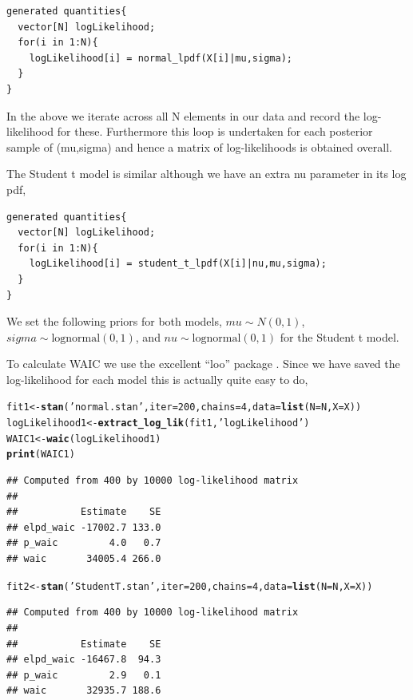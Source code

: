 \documentclass[11pt,fullpage]{book}
\makeatletter
\newenvironment{kframe}{%
	\def\at@end@of@kframe{}%
	\ifinner\ifhmode%
	\def\at@end@of@kframe{\end{minipage}}%
\begin{minipage}{\columnwidth}%
	\fi\fi%
	\def\FrameCommand##1{\hskip\@totalleftmargin \hskip-\fboxsep
		\colorbox{shadecolor}{##1}\hskip-\fboxsep
		\hskip-\linewidth \hskip-\@totalleftmargin \hskip\columnwidth}%
	\MakeFramed {\advance\hsize-\width
		\@totalleftmargin\z@ \linewidth\hsize
		\@setminipage}}%
{\par\unskip\endMakeFramed%
	\at@end@of@kframe}
\newcommand{\hlnum}[1]{\textcolor[rgb]{0.686,0.059,0.569}{#1}}%
\newcommand{\hlstr}[1]{\textcolor[rgb]{0.192,0.494,0.8}{#1}}%
\newcommand{\hlstd}[1]{\textcolor[rgb]{0.345,0.345,0.345}{#1}}%
\newcommand{\hlkwb}[1]{\textcolor[rgb]{0.69,0.353,0.396}{#1}}%
\newcommand{\hlkwc}[1]{\textcolor[rgb]{0.333,0.667,0.333}{#1}}%
\newcommand{\hlkwd}[1]{\textcolor[rgb]{0.737,0.353,0.396}{\textbf{#1}}}%
\newenvironment{knitrout}{}{} %
\makeatother
\begin{document}
\begin{verbatim}
generated quantities{
  vector[N] logLikelihood;
  for(i in 1:N){
    logLikelihood[i] = normal_lpdf(X[i]|mu,sigma);
  }
}
\end{verbatim}
In the above we iterate across all N elements in our data and record the log-likelihood for these. Furthermore this loop is undertaken for each posterior sample of (mu,sigma) and hence a matrix of log-likelihoods is obtained overall.

The Student t model is similar although we have an extra nu parameter in its log pdf,

\begin{verbatim}
generated quantities{
  vector[N] logLikelihood;
  for(i in 1:N){
    logLikelihood[i] = student_t_lpdf(X[i]|nu,mu,sigma);
  }
}
\end{verbatim}

We set the following priors for both models, $mu\sim N(0,1)$, $sigma\sim \text{lognormal}(0,1)$, and $nu\sim \text{lognormal}(0,1)$ for the Student t model. 

To calculate WAIC we use the excellent ``loo'' package \cite{vehtari2015efficient}. Since we have saved the log-likelihood for each model this is actually quite easy to do,

\begin{knitrout}\small
		\color{fgcolor}\begin{kframe}
			\begin{alltt}
\hlstd{fit1} \hlkwb{<-} \hlkwd{stan}\hlstd{(}\hlstr{'normal.stan'}\hlstd{,}\hlkwc{iter}\hlstd{=}\hlnum{200}\hlstd{,}\hlkwc{chains}\hlstd{=}\hlnum{4}\hlstd{,}\hlkwc{data}\hlstd{=}\hlkwd{list}\hlstd{(}\hlkwc{N}\hlstd{=N,}\hlkwc{X}\hlstd{=X))}
\hlstd{logLikelihood1} \hlkwb{<-} \hlkwd{extract_log_lik}\hlstd{(fit1,}\hlstr{'logLikelihood'}\hlstd{)}
\hlstd{WAIC1} \hlkwb{<-} \hlkwd{waic}\hlstd{(logLikelihood1)}
\hlkwd{print}\hlstd{(WAIC1)}
			\end{alltt}
			\begin{verbatim}
## Computed from 400 by 10000 log-likelihood matrix
## 
##           Estimate    SE
## elpd_waic -17002.7 133.0
## p_waic         4.0   0.7
## waic       34005.4 266.0
			\end{verbatim}
			
			\begin{alltt}
			\hlstd{fit2} \hlkwb{<-} \hlkwd{stan}\hlstd{(}\hlstr{'StudentT.stan'}\hlstd{,}\hlkwc{iter}\hlstd{=}\hlnum{200}\hlstd{,}\hlkwc{chains}\hlstd{=}\hlnum{4}\hlstd{,}\hlkwc{data}\hlstd{=}\hlkwd{list}\hlstd{(}\hlkwc{N}\hlstd{=N,}\hlkwc{X}\hlstd{=X))}
			\end{alltt}
			\begin{verbatim}
## Computed from 400 by 10000 log-likelihood matrix
## 
##           Estimate    SE
## elpd_waic -16467.8  94.3
## p_waic         2.9   0.1
## waic       32935.7 188.6
\end{verbatim}
		\end{kframe}
	\end{knitrout}
\end{document}
